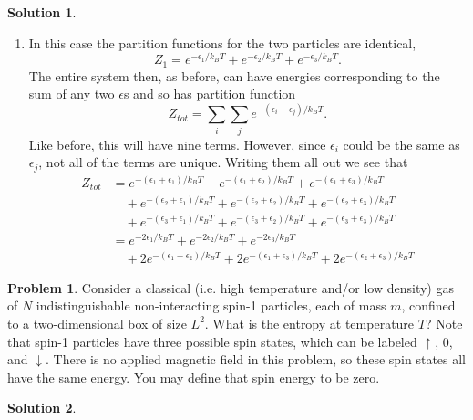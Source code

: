 \documentclass[10pt]{article}
\theoremstyle{definition}
\newtheorem{problem}{Problem}
\newtheorem{soln}{Solution}
\begin{document}
\begin{soln}
\begin{enumerate}[label=(\alph*)]
\begin{align*}
                   & \quad+e^{-(\beta_3+\alpha_1)/k_BT}+e^{-(\beta_3+\alpha_2)/k_BT}+e^{-(\beta_3+\alpha_3)/k_BT},
          \end{align*}
          indeed, the same answer, so $Z_{tot}=Z_AZ_B$.
    \item In this case the partition functions for the two particles are identical,
          $$Z_1=e^{-\epsilon_1/k_BT}+e^{-\epsilon_2/k_BT}+e^{-\epsilon_3/k_BT}.$$
          The entire system then, as before, can have energies corresponding to the sum of any two $\epsilon$s
          and so has partition function
          $$Z_{tot}=\sum_{i}\sum_je^{-(\epsilon_i+\epsilon_j)/k_BT}.$$
          Like before, this will have nine terms. However, since $\epsilon_i$ could be the same as $\epsilon_j$, not all of the terms are unique.
          Writing them all out we see that
          \begin{align*}
            Z_{tot} & =e^{-(\epsilon_1+\epsilon_1)/k_BT}+e^{-(\epsilon_1+\epsilon_2)/k_BT}+e^{-(\epsilon_1+\epsilon_3)/k_BT}         \\
                    & \quad+e^{-(\epsilon_2+\epsilon_1)/k_BT}+e^{-(\epsilon_2+\epsilon_2)/k_BT}+e^{-(\epsilon_2+\epsilon_3)/k_BT}    \\
                    & \quad+e^{-(\epsilon_3+\epsilon_1)/k_BT}+e^{-(\epsilon_3+\epsilon_2)/k_BT}+e^{-(\epsilon_3+\epsilon_3)/k_BT}    \\
                    & =e^{-2\epsilon_1/k_BT}+e^{-2\epsilon_2/k_BT}+e^{-2\epsilon_3/k_BT}                                             \\
                    & \quad+2e^{-(\epsilon_1+\epsilon_2)/k_BT}+2e^{-(\epsilon_1+\epsilon_3)/k_BT}+2e^{-(\epsilon_2+\epsilon_3)/k_BT}
          \end{align*}
  \end{enumerate}
\end{soln}

\begin{problem}
Consider a classical (i.e. high temperature and/or low density) gas of $N$ indistinguishable
non-interacting spin-1 particles, each of mass $m$, confined to a two-dimensional box of size
$L^2$. What is the entropy at temperature $T$? Note that spin-1 particles have three possible
spin states, which can be labeled $\uparrow$, $0$, and $\downarrow$. There is no applied magnetic field in this
problem, so these spin states all have the same energy. You may define that spin energy to
be zero.
\end{problem}
\begin{soln}

\end{soln}
\end{document}
